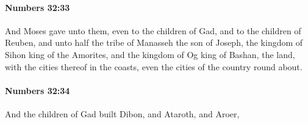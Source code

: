 		\paragraph{Numbers 32:33} %
			\label{NUMBERS-32-33}

			And Moses gave unto them, even to the children of Gad, and to the children of Reuben, and unto half the tribe of Manasseh the son of Joseph, the kingdom of Sihon king of the Amorites, and the kingdom of Og king of Bashan, the land, with the cities thereof in the coasts, even the cities of the country round about.


		\paragraph{Numbers 32:34} %
			\label{NUMBERS-32-34}

			And the children of Gad built Dibon, and Ataroth, and Aroer,

